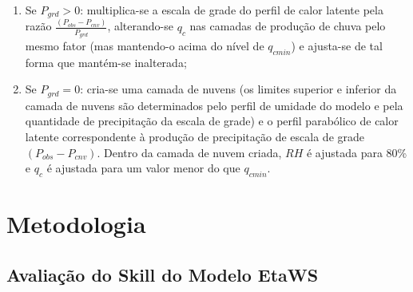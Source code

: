 \begin{enumerate}
\item Se $P_{grd}>0$: multiplica-se a escala de grade do perfil de calor latente pela razão $\frac{(P_{obs}-P_{cnv})}{P_{grd}}$, alterando-se $q_{c}$ nas camadas de produção de chuva pelo mesmo fator (mas mantendo-o acima do nível de $q_{cmin}$) e ajusta-se de tal forma que mantém-se inalterada;
\item Se $P_{grd}=0$: cria-se uma camada de nuvens (os limites superior e inferior da camada de nuvens são determinados pelo perfil de umidade do modelo e pela quantidade de precipitação da escala de grade) e o perfil parabólico de calor latente correspondente à produção de precipitação de escala de grade $(P_{obs}-P_{cnv})$. Dentro da camada de nuvem criada, $RH$ é ajustada para 80\% e $q_{c}$ é ajustada para um valor menor do que $q_{cmin}$.
\end{enumerate}

\section{Metodologia}
\label{ss:metodologia}

\subsection{Avaliação do Skill do Modelo EtaWS}


